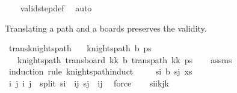 \begin{isabellebody}
%
\isadelimproof
\ \ %
\endisadelimproof
%
\isatagproof
{}\isamarkupfalse%
\ valid{\isacharunderscore}{\kern0pt}step{\isacharunderscore}{\kern0pt}def\ \isamarkupfalse%
\ auto%
\endisatagproof
{\isafoldproof}%
%
\isadelimproof
%
\endisadelimproof
%
\begin{isamarkuptext}%
Translating a path and a boards preserves the validity.%
\end{isamarkuptext}\isamarkuptrue%
\isamarkupfalse%
\ trans{\isacharunderscore}{\kern0pt}knights{\isacharunderscore}{\kern0pt}path{\isacharcolon}{\kern0pt}\isanewline
\ \ \ {\isachardoublequoteopen}knights{\isacharunderscore}{\kern0pt}path\ b\ ps{\isachardoublequoteclose}\isanewline
\ \ \ {\isachardoublequoteopen}knights{\isacharunderscore}{\kern0pt}path\ {\isacharparenleft}{\kern0pt}trans{\isacharunderscore}{\kern0pt}board\ {\isacharparenleft}{\kern0pt}kk\ b{\isacharparenright}{\kern0pt}\ {\isacharparenleft}{\kern0pt}trans{\isacharunderscore}{\kern0pt}path\ {\isacharparenleft}{\kern0pt}kk\ ps{\isacharparenright}{\kern0pt}{\isachardoublequoteclose}\isanewline
%
\isadelimproof
\ \ %
\endisadelimproof
%
\isatagproof
{}\isamarkupfalse%
\ assms\isanewline
{}\isamarkupfalse%
\ {\isacharparenleft}{\kern0pt}induction\ rule{\isacharcolon}{\kern0pt}\ knights{\isacharunderscore}{\kern0pt}path{\isachardot}{\kern0pt}induct{\isacharparenright}{\kern0pt}\isanewline
\ \ \isamarkupfalse%
\ {\isacharparenleft}{\kern0pt}{}\ s\isactrlsub i\ b\ s\isactrlsub j\ xs{\isacharparenright}{\kern0pt}\isanewline
\ \ \isamarkupfalse%
\ \isamarkupfalse%
\ i\ j\ i{\isacharprime}{\kern0pt}\ j{\isacharprime}{\kern0pt}\ \ split{\isacharcolon}{\kern0pt}\ {\isachardoublequoteopen}s\isactrlsub i\ {\isacharequal}{\kern0pt}\ {\isacharparenleft}{\kern0pt}i{\isacharcomma}{\kern0pt}j{\isacharparenright}{\kern0pt}{\isachardoublequoteclose}\ {\isachardoublequoteopen}s\isactrlsub j\ {\isacharequal}{\kern0pt}\ {\isacharparenleft}{\kern0pt}i{\isacharprime}{\kern0pt}{\isacharcomma}{\kern0pt}j{\isacharprime}{\kern0pt}{\isacharparenright}{\kern0pt}{\isachardoublequoteclose}\ \isamarkupfalse%
\ force\isanewline
\ \ \isamarkupfalse%
\ {\isacharquery}{\kern0pt}s\isactrlsub i{\isacharequal}{\kern0pt}{\isachardoublequoteopen}{\isacharparenleft}{\kern0pt}i{\isacharplus}{\kern0pt}kj{\isacharplus}{\kern0pt}k\isanewline

\end{isabellebody}
